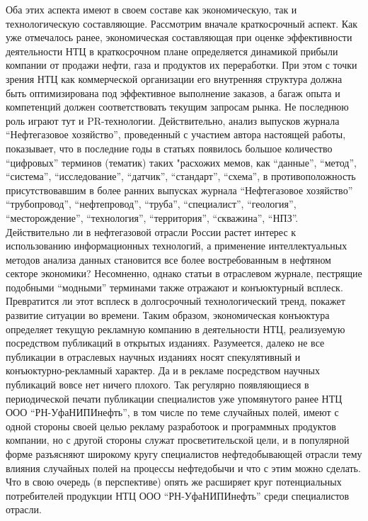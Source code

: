 Оба этих аспекта имеют в своем составе как экономическую, так и технологическую составляющие. Рассмотрим вначале краткосрочный аспект.
Как уже отмечалось ранее, экономическая составляющая при оценке эффективности деятельности НТЦ в краткосрочном плане определяется динамикой прибыли компании от продажи нефти, газа и продуктов их переработки.
При этом с точки зрения НТЦ как коммерческой организации его внутренняя структура должна быть оптимизирована под эффективное выполнение заказов, а багаж опыта и компетенций должен соответствовать текущим запросам рынка.
Не последнюю роль играют тут и PR-технологии.
Действительно, анализ выпусков журнала ``Нефтегазовое хозяйство'', проведенный с участием автора настоящей работы, показывает, что в последние годы в статьях появилось большое количество ``цифровых'' терминов (тематик) таких "расхожих мемов, как ``данные'', ``метод'', ``система'', ``исследование'', ``датчик'', ``стандарт'', ``схема'', в противоположность присутствовавшим в более ранних выпусках журнала ``Нефтегазовое хозяйство'' ``трубопровод'', ``нефтепровод'', ``труба'', ``специалист'', ``геология'', ``месторождение'', ``технология'', ``территория'', ``скважина'', ``НПЗ''.
Действительно ли в нефтегазовой отрасли России растет интерес к использованию информационных технологий, а применение интеллектуальных методов анализа данных становится все более востребованным в нефтяном секторе экономики? 
Несомненно, однако статьи в отраслевом журнале, пестрящие подобными ``модными'' терминами также отражают и конъюктурный всплеск.
Превратится ли этот всплеск в долгосрочный технологический тренд, покажет развитие ситуации во времени.
Таким образом, экономическая конъюктура определяет текущую рекламную компанию в деятельности НТЦ, реализуемую посредством публикаций в открытых изданиях.
Разумеется, далеко не все публикации в отраслевых научных изданиях носят спекулятивный и конъюктурно-рекламный характер.
Да и в рекламе посредством научных публикаций вовсе нет ничего плохого.
Так регулярно появляющиеся в периодической печати публикации специалистов уже упомянутого ранее НТЦ ООО ``РН-УфаНИПИнефть'', в том числе по теме случайных полей, имеют с одной стороны своей целью рекламу разработоок и программных продуктов компании, но с другой стороны служат просветительской цели, и в популярной форме разъясняют широкому кругу специалистов нефтедобывающей отрасли тему влияния случайных полей на процессы нефтедобычи и что с этим можно сделать.
Что в свою очередь (в перспективе) опять же расширяет круг потенциальных потребителей продукции НТЦ ООО ``РН-УфаНИПИнефть'' среди специалистов отрасли.

